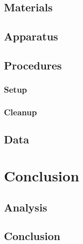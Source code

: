 \documentclass[12 pt]{report}
\begin{document}
\section{Materials} \label{materials}

\section{Apparatus} \label{apparatus}

\section{Procedures} \label{procedures}
\subsection{Setup} \label{procedures-setup}

\subsection{Cleanup} \label{procedures-cleanup}

\section{Data} \label{data}

\chapter{Conclusion} \label{conclusion-chapter}
\section{Analysis} \label{analysis}

\section{Conclusion} \label{conclusion-section}

\printbibliography[heading=subbibintoc]
\appendix
\end{document}
